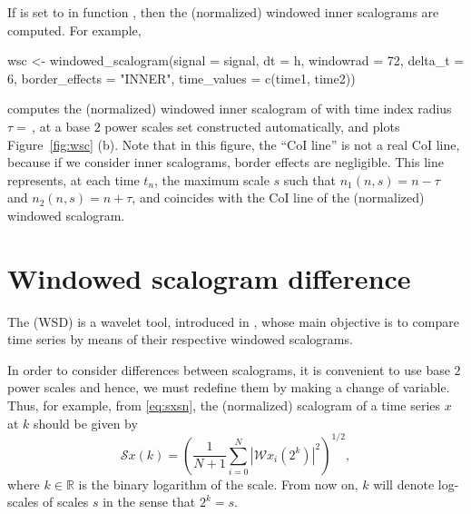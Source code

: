 If  is set to  in function , then the (normalized) windowed inner scalograms are computed. For example,
\begin{example}
wsc <- windowed_scalogram(signal = signal, dt = h,
                          windowrad = 72, delta_t = 6,
                          border_effects = "INNER",
                          time_values = c(time1, time2))
\end{example}
computes the (normalized) windowed inner scalogram of  with time index radius $\tau=\,$, at a base $2$ power scales set constructed automatically, and plots Figure~\ref{fig:wsc} (b). Note that in this figure, the ``CoI line'' is not a real CoI line, because if we consider inner scalograms, border effects are negligible. This line represents, at each time $t_n$, the maximum scale $s$ such that $n_1(n,s)=n-\tau $ and $n_2(n,s)=n+\tau $, and coincides with the CoI line of the (normalized) windowed scalogram.

\section{Windowed scalogram difference}
\label{sec4}

The  (WSD) is a wavelet tool, introduced in \citet{bol17}, whose main objective is to compare time series by means of their respective windowed scalograms.

In order to consider differences between scalograms, it is convenient to use base $2$ power scales \citep{bol17} and hence, we must redefine them by making a change of variable. Thus, for example, from \eqref{eq:sxsn}, the (normalized) scalogram of a time series $x$ at  $k$ should be given by
\begin{equation}
\label{eq:sxkn}
\mathcal{S}x(k)= \left( \frac{1}{N+1}\sum _{i=0}^{N} | \mathcal{W}x_i(2^k) | ^2 \right) ^{1/2},
\end{equation}
where $k\in \mathbb{R}$ is the binary logarithm of the scale. From now on, $k$ will denote log-scales of scales $s$ in the sense that $2^k=s$.

